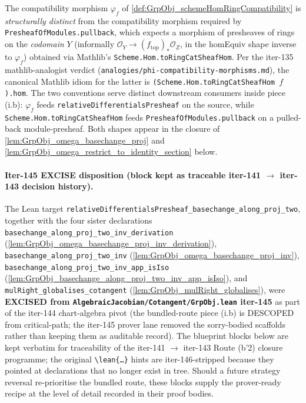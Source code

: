 \begin{remark}
  \label{rem:GrpObj_schemeHomRingCompatibility_vs_toRingCatSheafHom}
  
  The compatibility morphism \(\varphi_f\) of \cref{def:GrpObj_schemeHomRingCompatibility} is \emph{structurally distinct} from the compatibility morphism required by \texttt{PresheafOfModules.pullback}, which expects a morphism of presheaves of rings on the \emph{codomain} \(Y\) (informally \(\mathcal O_Y \to (f_{\mathrm{top}})_{*} \mathcal O_Z\), in the homEquiv shape inverse to \(\varphi_f\)) obtained via Mathlib's \texttt{Scheme.Hom.toRingCatSheafHom}. Per the iter-135 mathlib-analogist verdict (\texttt{analogies/phi-compatibility-morphisms.md}), the canonical Mathlib idiom for the latter is \texttt{(Scheme.Hom.toRingCatSheafHom \(f\)).hom}. The two conventions serve distinct downstream consumers inside piece (i.b): \(\varphi_f\) feeds \texttt{relativeDifferentialsPresheaf} on the source, while \texttt{Scheme.Hom.toRingCatSheafHom} feeds \texttt{PresheafOfModules.pullback} on a pulled-back module-presheaf. Both shapes appear in the closure of \cref{lem:GrpObj_omega_basechange_proj} and \cref{lem:GrpObj_omega_restrict_to_identity_section} below.
\end{remark}

\paragraph{Iter-145 EXCISE disposition (block kept as traceable iter-141 \(\to\) iter-143 decision history).}
The Lean target \texttt{relativeDifferentialsPresheaf\_basechange\_along\_proj\_two}, together with the four sister declarations \texttt{basechange\_along\_proj\_two\_inv\_derivation} (\cref{lem:GrpObj_omega_basechange_proj_inv_derivation}), \texttt{basechange\_along\_proj\_two\_inv} (\cref{lem:GrpObj_omega_basechange_proj_inv}), \texttt{basechange\_along\_proj\_two\_inv\_app\_isIso} (\cref{lem:GrpObj_basechange_along_proj_two_inv_app_isIso}), and \texttt{mulRight\_globalises\_cotangent} (\cref{lem:GrpObj_mulRight_globalises}), were \textbf{EXCISED from \texttt{AlgebraicJacobian/Cotangent/GrpObj.lean} iter-145} as part of the iter-144 chart-algebra pivot (the bundled-route piece (i.b) is DESCOPED from critical-path; the iter-145 prover lane removed the sorry-bodied scaffolds rather than keeping them as auditable record). The blueprint blocks below are kept verbatim for traceability of the iter-141 \(\to\) iter-143 Route (b'2) closure programme; the original \texttt{\textbackslash lean\{\ldots\}} hints are iter-146-stripped because they pointed at declarations that no longer exist in tree. Should a future strategy reversal re-prioritise the bundled route, these blocks supply the prover-ready recipe at the level of detail recorded in their proof bodies.


